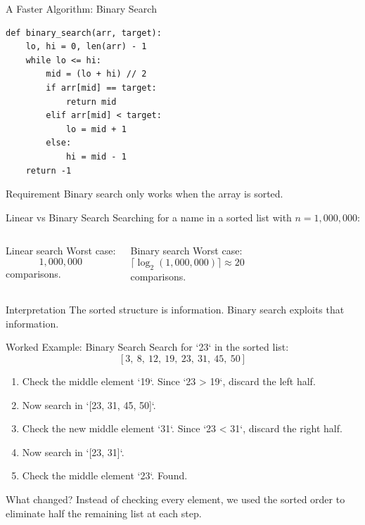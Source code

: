 \documentclass[aspectratio=169,xcolor=dvipsnames]{beamer}
\begin{document}
\begin{frame}[fragile]{A Faster Algorithm: Binary Search}
  \begin{lstlisting}
def binary_search(arr, target):
    lo, hi = 0, len(arr) - 1
    while lo <= hi:
        mid = (lo + hi) // 2
        if arr[mid] == target:
            return mid
        elif arr[mid] < target:
            lo = mid + 1
        else:
            hi = mid - 1
    return -1
  \end{lstlisting}
  \begin{alertblock}{Requirement}
    Binary search only works when the array is sorted.
  \end{alertblock}
\end{frame}

\begin{frame}{Linear vs Binary Search}
  Searching for a name in a sorted list with $n = 1,000,000$:
  \begin{columns}
    \begin{block}{Linear search}
      Worst case:
      \[
        1,000,000
      \]
      comparisons.
    \end{block}
    \begin{exampleblock}{Binary search}
      Worst case:
      \[
        \lceil \log_2(1,000,000) \rceil \approx 20
      \]
      comparisons.
    \end{exampleblock}
  \end{columns}
  \vspace{0.6em}
  \begin{block}{Interpretation}
    The sorted structure is information. Binary search exploits that information.
  \end{block}
\end{frame}

\begin{frame}{Worked Example: Binary Search}
  Search for `23` in the sorted list:
  \[
    [3,\ 8,\ 12,\ 19,\ 23,\ 31,\ 45,\ 50]
  \]

  \vspace{0.4em}
  \begin{enumerate}
    \item Check the middle element `19`. Since `23 > 19`, discard the left half.
    \item Now search in `[23, 31, 45, 50]`.
    \item Check the new middle element `31`. Since `23 < 31`, discard the right half.
    \item Now search in `[23, 31]`.
    \item Check the middle element `23`. Found.
  \end{enumerate}

  \vspace{0.4em}
  \begin{block}{What changed?}
    Instead of checking every element, we used the sorted order to eliminate half the remaining list at each step.
  \end{block}
\end{frame}
\end{document}
